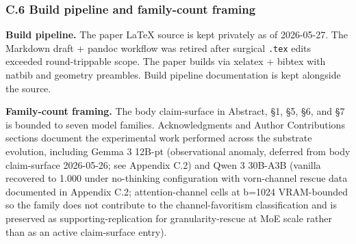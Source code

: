 \documentclass[
]{article}
\begin{document}
\subsubsection{C.6 Build pipeline and family-count
framing}\label{c-6-build-pipeline-and-family-count-framing}

\textbf{Build pipeline.} The paper LaTeX source is kept privately as of
2026-05-27. The Markdown draft + pandoc workflow was retired after
surgical \texttt{.tex} edits exceeded round-trippable scope. The paper
builds via xelatex + bibtex with natbib and geometry preambles. Build
pipeline documentation is kept alongside the source.

\textbf{Family-count framing.} The body claim-surface in Abstract, \S1,
\S5, \S6, and \S7 is bounded to seven model families. Acknowledgments
and Author Contributions sections document the experimental work
performed across the substrate evolution, including Gemma 3 12B-pt
(observational anomaly, deferred from body claim-surface 2026-05-26;
see Appendix C.2) and Qwen 3 30B-A3B (vanilla recovered to 1.000 under
no-thinking configuration with vorn-channel rescue data documented in
Appendix C.2; attention-channel cells at b=1024 VRAM-bounded so the
family does not contribute to the channel-favoritism classification
and is preserved as supporting-replication for granularity-rescue at
MoE scale rather than as an active claim-surface entry).



\end{document}
